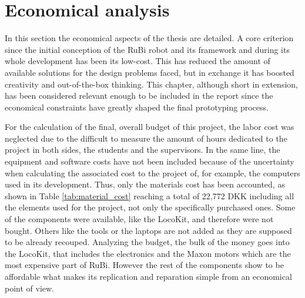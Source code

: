 \chapter{Economical analysis} %
\label{cha:economical_aspects}
In this section the economical aspects of the thesis are detailed.
A core criterion since the initial conception of the RuBi robot and its framework and during its whole development has been its low-cost.
This has reduced the amount of available solutions for the design problems faced, but in exchange it has boosted creativity and out-of-the-box thinking.
This chapter, although short in extension, has been considered relevant enough to be included in the report since the economical constraints have greatly shaped the final prototyping process.

For the calculation of the final, overall budget of this project, the labor cost was neglected due to the difficult to measure the amount of hours dedicated to the project in both sides, the students and the supervisors.
In the same line, the equipment and software costs have not been included because of the uncertainty when calculating the associated cost to the project of, for example, the computers used in its development.
Thus, only the materials cost has been accounted, as shown in Table \ref{tab:material_cost} reaching a total of 22,772 DKK including all the elements used for the project, not only the specifically purchased ones.
Some of the components were available, like the LocoKit, and therefore were not bought.
Others like the tools or the laptops are not added as they are supposed to be already recouped.
Analyzing the budget, the bulk of the money goes into the LocoKit, that includes the electronics and the Maxon motors which are the most expensive part of RuBi.
However the rest of the components show to be affordable what makes its replication and reparation simple from an economical point of view.

